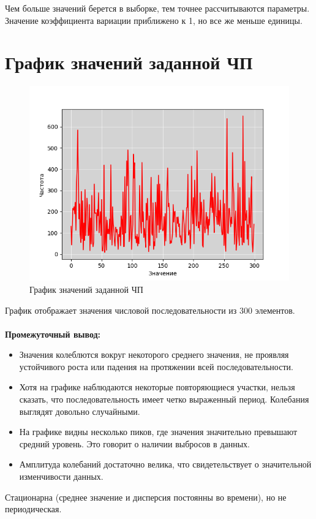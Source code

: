 \documentclass{article}
\begin{document}
    Чем больше значений берется в выборке, тем точнее рассчитываются параметры.
    Значение коэффициента вариации приближено к 1, но все же меньше
    единицы.

\section{График значений заданной ЧП}

\begin{figure}[ht]
    \centering
    \includegraphics[width=.8\textwidth]{1}
    \caption{График значений заданной ЧП}
\end{figure}

График отображает значения числовой последовательности из 300 элементов.
\\ \\
\textbf{Промежуточный вывод:}
\begin{itemize}
    \item Значения колеблются вокруг некоторого среднего значения, не проявляя устойчивого роста или падения на протяжении всей последовательности.
    \item Хотя на графике наблюдаются некоторые повторяющиеся участки, нельзя сказать, что последовательность имеет четко выраженный период. Колебания выглядят довольно случайными.
    \item На графике видны несколько пиков, где значения значительно превышают средний уровень. Это говорит о наличии выбросов в данных.
    \item Амплитуда колебаний достаточно велика, что свидетельствует о значительной изменчивости данных.
\end{itemize}
Стационарна (среднее значение и дисперсия постоянны во времени), но не периодическая.
\end{document}
